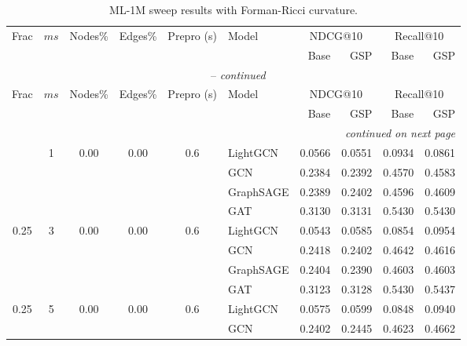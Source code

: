 {\footnotesize
\setlength{\tabcolsep}{4pt}
\begin{longtable}{cccccl rrrr}
\caption{ML-1M sweep results with Forman-Ricci curvature.}
\label{tab:ml1m_forman_ricci_sweep} \\
\toprule
\multirow{2}{*}{Frac} & \multirow{2}{*}{$ms$} & \multirow{2}{*}{Nodes\%} & \multirow{2}{*}{Edges\%} & \multirow{2}{*}{Prepro (s)} & \multirow{2}{*}{Model} &
  \multicolumn{2}{c}{NDCG@10} & \multicolumn{2}{c}{Recall@10} \\
\cmidrule(lr){7-8}\cmidrule(lr){9-10}
 & & & & & & Base & GSP & Base & GSP \\
\midrule
\endfirsthead
\multicolumn{10}{c}{\tablename~\thetable{} -- \textit{continued}} \\
\toprule
\multirow{2}{*}{Frac} & \multirow{2}{*}{$ms$} & \multirow{2}{*}{Nodes\%} & \multirow{2}{*}{Edges\%} & \multirow{2}{*}{Prepro (s)} & \multirow{2}{*}{Model} &
  \multicolumn{2}{c}{NDCG@10} & \multicolumn{2}{c}{Recall@10} \\
\cmidrule(lr){7-8}\cmidrule(lr){9-10}
 & & & & & & Base & GSP & Base & GSP \\
\midrule
\endhead
\midrule \multicolumn{10}{r}{\textit{continued on next page}} \\
\endfoot
\bottomrule
\endlastfoot
\multirow{4}{*}{0.25} & \multirow{4}{*}{1} & \multirow{4}{*}{0.00} & \multirow{4}{*}{0.00} & \multirow{4}{*}{0.6} & LightGCN & 0.0566 & 0.0551 & 0.0934 & 0.0861 \\
 & & & & & GCN & 0.2384 & 0.2392 & 0.4570 & 0.4583 \\
 & & & & & GraphSAGE & 0.2389 & 0.2402 & 0.4596 & 0.4609 \\
 & & & & & GAT & 0.3130 & 0.3131 & 0.5430 & 0.5430 \\
\midrule
\multirow{4}{*}{0.25} & \multirow{4}{*}{3} & \multirow{4}{*}{0.00} & \multirow{4}{*}{0.00} & \multirow{4}{*}{0.6} & LightGCN & 0.0543 & 0.0585 & 0.0854 & 0.0954 \\
 & & & & & GCN & 0.2418 & 0.2402 & 0.4642 & 0.4616 \\
 & & & & & GraphSAGE & 0.2404 & 0.2390 & 0.4603 & 0.4603 \\
 & & & & & GAT & 0.3123 & 0.3128 & 0.5430 & 0.5437 \\
\midrule
\multirow{4}{*}{0.25} & \multirow{4}{*}{5} & \multirow{4}{*}{0.00} & \multirow{4}{*}{0.00} & \multirow{4}{*}{0.6} & LightGCN & 0.0575 & 0.0599 & 0.0848 & 0.0940 \\
 & & & & & GCN & 0.2402 & 0.2445 & 0.4623 & 0.4662 \\

\end{longtable}}
